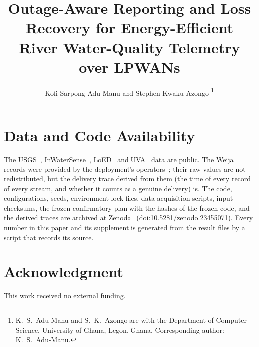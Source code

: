 \documentclass[journal]{IEEEtran}
\begin{document}
\title{Outage-Aware Reporting and Loss Recovery for Energy-Efficient River Water-Quality Telemetry over LPWANs}

\author{Kofi Sarpong Adu-Manu and Stephen Kwaku Azongo
\thanks{K.~S.~Adu-Manu and S.~K.~Azongo are with the Department of Computer Science, University of Ghana, Legon, Ghana. Corresponding author: K.~S.~Adu-Manu.}}

\maketitle











\section*{Data and Code Availability}
The USGS~\cite{usgs2023nwis}, InWaterSense~\cite{ahmedi2021inwatersense}, LoED~\cite{bhatia2020loeddata} and UVA~\cite{nikseresht2025uvadata} data are public. The Weija records were provided by the deployment's operators~\cite{adumanu2020smart}; their raw values are not redistributed, but the delivery trace derived from them (the time of every record of every stream, and whether it counts as a genuine delivery) is. The code, configurations, seeds, environment lock files, data-acquisition scripts, input checksums, the frozen confirmatory plan with the hashes of the frozen code, and the derived traces are archived at Zenodo~\cite{azongo2026code} (doi:10.5281/zenodo.23455071). Every number in this paper and its supplement is generated from the result files by a script that records its source.

\section*{Acknowledgment}
This work received no external funding.



\end{document}

